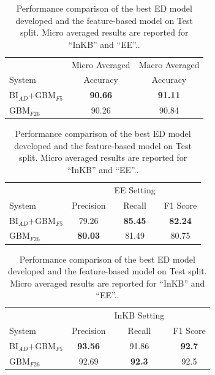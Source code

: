 \documentclass{report}
\theoremstyle{definition}
\theoremstyle{remark}
\begin{document}
\begin{table}
    \caption{Performance comparison of different ED models on the Validation split. Micro averaged results are reported for ``InKB'' and ``EE''.}
    \label{tab:edresultsval}
\end{table}

\begin{table}
    \centering
    \begin{tabular}{lcc}
    &Micro Averaged & Macro Averaged\\
    System    & Accuracy &Accuracy \\
    \hline
    BI$_{AD}$+GBM$_{F5}$   &\textcolor{ao}{\textbf{90.66}} & \textcolor{ao}{\textbf{91.11}}\\
    GBM$_{F26}$ & 90.26&	90.84\\
    \end{tabular}
    
    \vspace{0.5cm}\begin{tabular}{lccc}
    &&EE Setting & \\
    System  & Precision & Recall & F1 Score \\
    \hline
     BI$_{AD}$+GBM$_{F5}$   &79.26 &\textcolor{ao}{\textbf{85.45}}&\textcolor{ao}{\textbf{82.24}}\\
    GBM$_{F26}$   & \textcolor{ao}{\textbf{80.03}}&	81.49&	80.75\\
    \end{tabular}
    
    \vspace{0.5cm}\begin{tabular}{lccc}
    &&InKB Setting & \\
    System  & Precision & Recall & F1 Score \\
    \hline
     BI$_{AD}$+GBM$_{F5}$   &\textcolor{ao}{\textbf{93.56}}  &91.86 &\textcolor{ao}{\textbf{92.7}}\\
    GBM$_{F26}$   & 92.69&	\textcolor{ao}{\textbf{92.3}}&	92.5\\
    \end{tabular}
    		

    \caption{Performance comparison of the best  ED model developed and the feature-based model on Test split. Micro averaged results are reported for ``InKB'' and ``EE''..}
    \label{tab:edresultstest}
\end{table}
\end{document}
